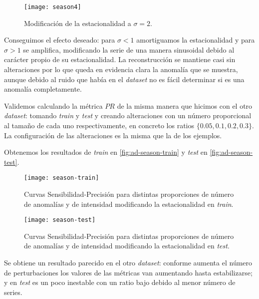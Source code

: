 \begin{figure}[htpb]
  \centering
  \texttt{[image: season4]}
  \caption{Modificación de la estacionalidad a $\sigma = 2$.}
  \label{fig:ad-season4}
\end{figure}

Conseguimos el efecto deseado: para $\sigma < 1$ amortiguamos la estacionalidad y para $\sigma > 1$ se amplifica, modificando la serie de una manera sinusoidal debido al carácter propio de su estacionalidad. La reconstrucción se mantiene casi sin alteraciones por lo que queda en evidencia clara la anomalía que se muestra, aunque debido al ruido que había en el \emph{dataset} no es fácil determinar si es una anomalía completamente.

Validemos calculando la métrica $PR$ de la misma manera que hicimos con el otro \emph{dataset}: tomando \emph{train} y \emph{test} y creando alteraciones con un número proporcional al tamaño de cada uno respectivamente, en concreto los ratios $\{0.05, 0.1, 0.2, 0.3\}$. La configuración de las alteraciones es la misma que la de los ejemplos.

Obtenemos los resultados de \emph{train} en \autoref{fig:ad-season-train} y \emph{test} en \autoref{fig:ad-season-test}.

\begin{figure}[htpb]
  \centering
  \texttt{[image: season-train]}
  \caption{Curvas Sensibilidad-Precisión para distintas proporciones de número de anomalías y de intensidad modificando la estacionalidad en \emph{train}.}
  \label{fig:ad-season-train}
\end{figure}

\begin{figure}[htpb]
  \centering
  \texttt{[image: season-test]}
  \caption{Curvas Sensibilidad-Precisión para distintas proporciones de número de anomalías y de intensidad modificando la estacionalidad en \emph{test}.}
  \label{fig:ad-season-test}
\end{figure}

Se obtiene un resultado parecido en el otro \emph{dataset}: conforme aumenta el número de perturbaciones los valores de las métricas van aumentando hasta estabilizarse; y en \emph{test} es un poco inestable con un ratio bajo debido al menor número de series.

